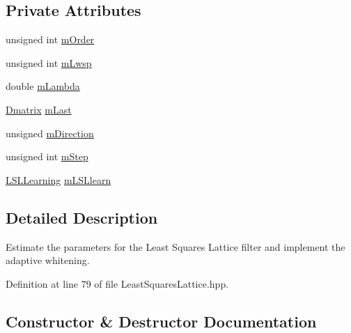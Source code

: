 \subsection*{Private Attributes}
\begin{DoxyCompactItemize}
\item 
unsigned int \hyperlink{classtsa_1_1_least_squares_lattice_a714e35374ee38156cf0fa4816340a6df}{m\+Order}
\item 
unsigned int \hyperlink{classtsa_1_1_least_squares_lattice_a00bb9716623be7c8a035c9947023dcda}{m\+Lwsp}
\item 
double \hyperlink{classtsa_1_1_least_squares_lattice_a4b1315dc119c22efae15dd97168a5701}{m\+Lambda}
\item 
\hyperlink{namespacetsa_ad260cd21c1891c4ed391fe788569aba4}{Dmatrix} \hyperlink{classtsa_1_1_least_squares_lattice_a3170c018ba5b3dcfb91c9490e11e6199}{m\+Last}
\item 
unsigned \hyperlink{classtsa_1_1_least_squares_lattice_a40b578afe8b8e4523cc827337177412c}{m\+Direction}
\item 
unsigned int \hyperlink{classtsa_1_1_least_squares_lattice_a17c54dba21bbf5ae79d6687f554eceb9}{m\+Step}
\item 
\hyperlink{classtsa_1_1_l_s_l_learning}{L\+S\+L\+Learning} \hyperlink{classtsa_1_1_least_squares_lattice_a720cbccb82705799e96c4053cd1963af}{m\+L\+S\+Llearn}
\end{DoxyCompactItemize}


\subsection{Detailed Description}
Estimate the parameters for the Least Squares Lattice filter and implement the adaptive whitening. 

Definition at line 79 of file Least\+Squares\+Lattice.\+hpp.



\subsection{Constructor \& Destructor Documentation}
\mbox{\label{classtsa_1_1_least_squares_lattice_a0fa6ec81a0438b15892c2dbc49932ea0}} 
